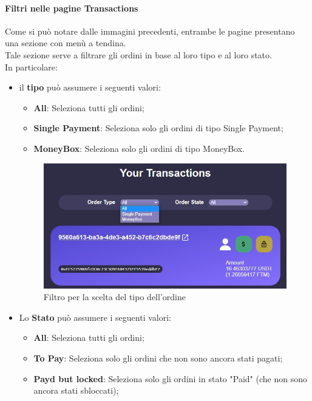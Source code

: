         \paragraph{Filtri nelle pagine Transactions}
        Come si può notare dalle immagini precedenti, entrambe le pagine presentano una sezione con menù a tendina.\\
        Tale sezione serve a filtrare gli ordini in base al loro tipo e al loro stato.\\
        In particolare:
        \begin{itemize}
            \item il \textbf{tipo} può assumere i seguenti valori:
            \begin{itemize}
                \item \textbf{All}: Seleziona tutti gli ordini;
                \item \textbf{Single Payment}: Seleziona solo gli ordini di tipo Single Payment;
                \item \textbf{MoneyBox}: Seleziona solo gli ordini di tipo MoneyBox.
            \end{itemize}
            \begin{figure}[H]
                \centering
                \includegraphics[scale=0.4]{immagini/Transaction/ordertype.jpg}
            \caption{Filtro per la scelta del tipo dell'ordine}
            \end{figure}
            \item Lo \textbf{Stato} può assumere i seguenti valori:
            \begin{itemize}
                \item \textbf{All}: Seleziona tutti gli ordini;
                \item \textbf{To Pay}: Seleziona solo gli ordini che non sono ancora stati pagati;
                \item \textbf{Payd but locked}: Seleziona solo gli ordini in stato "Paid" (che non sono ancora stati sbloccati);

\end{itemize}
\end{itemize}
